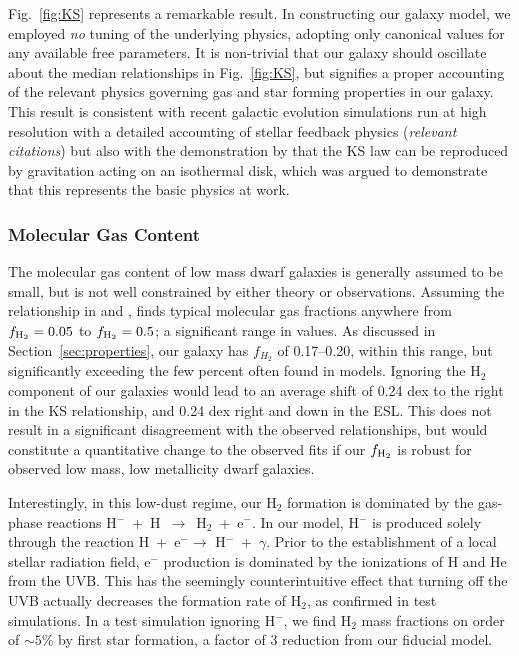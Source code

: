 \documentclass[twocolumn]{aastex61}
\begin{document}
Fig.~\ref{fig:KS} represents a remarkable result. In constructing our galaxy model, we employed \textit{no} tuning of the underlying physics, adopting only canonical values for any available free parameters. It is non-trivial that our galaxy should oscillate about the median relationships in Fig.~\ref{fig:KS}, but signifies a proper accounting of the relevant physics governing gas and star forming properties in our galaxy. This result is consistent with recent galactic evolution simulations run at high resolution with a detailed accounting of stellar feedback physics (\textit{relevant citations})
   but also with the demonstration by \citet{Li2005} that the KS law can be reproduced 
   by gravitation acting on an isothermal disk, which was argued to demonstrate that 
   this represents the basic physics at work.

\subsubsection{Molecular Gas Content}
\label{sec:molecular gas content}

The molecular gas content of low mass dwarf galaxies is generally assumed
to be small, but is not well constrained by either theory or observations. Assuming the relationship in \citet{Leroy2013} and \citet{Momose2013}, \citet{Roychowdhury2014} finds typical molecular gas fractions anywhere from $f_{\rm H_2} = 0.05$ to $f_{\rm H_2} = 0.5$; a significant range in values. As discussed in Section~\ref{sec:properties}, our galaxy has $f_{H_2}$ of 0.17--0.20, within this range, but significantly exceeding the few percent often found in models. Ignoring the H$_2$ component of our galaxies would lead to an average shift of 0.24 dex to the right in the KS relationship, and 0.24 dex right and down in the ESL. This does not result in a significant disagreement with the observed relationships, but would constitute a quantitative change to the observed fits if our $f_{\rm H_2}$ is robust for observed low mass, low metallicity dwarf galaxies. 

Interestingly, in this low-dust regime, our H$_2$ formation is dominated by the gas-phase reactions H$^-$~+~H~$\rightarrow$~H$_2$~+~e$^{-}$. In our model, H$^{-}$ is produced solely through the reaction H~+~e$^{-} \rightarrow$ H$^{-}$~+~$\gamma$. Prior to the establishment of a local stellar radiation field, e$^{-}$ production is dominated by the ionizations of H and He from the UVB. This has the seemingly counterintuitive effect that turning off the UVB actually decreases the formation rate of H$_2$, as confirmed in test simulations. In a test simulation ignoring H$^{-}$, we find H$_{2}$ mass fractions on order of  $\sim 5\%$ by first star formation, a factor of 3 reduction from our fiducial model.
\end{document}
